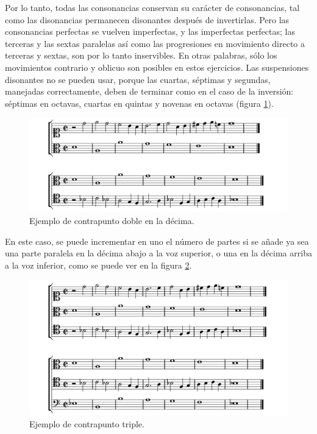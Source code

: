 \documentclass[letterpaper,12pt]{book}
\theoremstyle{definition} \newtheorem{Def}{Definición}[chapter]
\theoremstyle{definition} \newtheorem{Teo}{Teorema}[chapter]
\theoremstyle{definition} \newtheorem{Pro}{Proposición}[chapter]
\theoremstyle{definition} \newtheorem{Lema}{Lema}[chapter]
\begin{document}
Por lo tanto, todas las consonancias conservan su carácter de consonancias, tal como las disonancias permanecen disonantes después de invertirlas. Pero las consonancias perfectas se vuelven imperfectas, y las imperfectas perfectas; las terceras y las sextas paralelas así como las progresiones en movimiento directo a terceras y sextas, son por lo tanto inservibles. En otras palabras, sólo los movimientos contrario y oblicuo son posibles en estos ejercicios. Las suspensiones disonantes no se pueden usar, porque las cuartas, séptimas y segundas, manejadas correctamente, deben de terminar como en el caso de la inversión: séptimas en octavas, cuartas en quintas y novenas en octavas (figura \ref{Doble10}).

\begin{figure}[h]
\centering
\includegraphics[angle=0, width=1\textwidth]{Doble10.png}
\caption{\label{Doble10}Ejemplo de contrapunto doble en la décima.}
\end{figure}
  
  En este caso, se puede incrementar en uno el número de partes si se añade ya sea una parte paralela en la décima abajo a la voz superior, o una en la décima arriba a la voz inferior, como se puede ver en la figura \ref{Triple}.

\begin{figure}[h]
\centering
\includegraphics[angle=0, width=1\textwidth]{Triple.png}
\caption{\label{Triple}Ejemplo de contrapunto triple.}
\end{figure}
\end{document}

